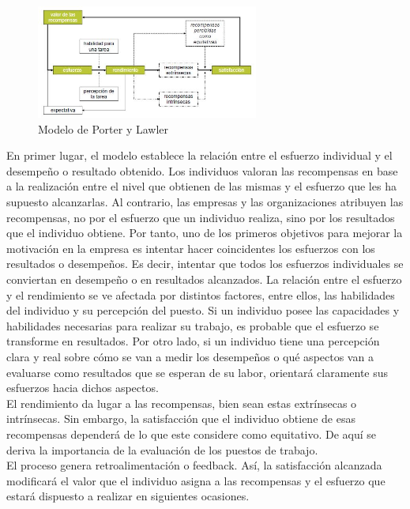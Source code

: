 \documentclass[12pt]{article}
\theoremstyle{definition_wo_parentheses}
\begin{document}
\begin{figure}[H]
\centering
\includegraphics[width=0.65\textwidth]{porter}
\caption{Modelo de Porter y Lawler}
\label{fig:porter}
\end{figure}

En primer lugar, el modelo establece la relación entre el esfuerzo individual y el desempeño o resultado obtenido. Los individuos valoran las recompensas en base a la realización entre el nivel que obtienen de las mismas y el esfuerzo que les ha supuesto alcanzarlas. Al contrario, las empresas y las organizaciones atribuyen las recompensas, no por el esfuerzo que un individuo realiza, sino por los resultados que el individuo obtiene. Por tanto, uno de los primeros objetivos para mejorar la motivación  en la empresa es intentar hacer coincidentes los esfuerzos con los resultados o desempeños. Es decir, intentar que todos los esfuerzos individuales se conviertan en desempeño o en resultados alcanzados. La relación entre el esfuerzo y el rendimiento se ve afectada por distintos factores, entre ellos, las habilidades del individuo y su percepción del puesto. Si un individuo posee las capacidades y habilidades necesarias para realizar su trabajo, es probable que el esfuerzo se transforme en resultados. Por otro lado, si un individuo tiene una percepción clara y real sobre cómo se van a medir los desempeños o qué aspectos van a evaluarse como resultados que se esperan de su labor, orientará claramente sus esfuerzos hacia dichos aspectos.\\

El rendimiento da lugar a las recompensas, bien sean estas extrínsecas o intrínsecas. Sin embargo, la satisfacción que el individuo obtiene de esas recompensas dependerá de lo que este considere como equitativo. De aquí se deriva la importancia de la evaluación de los puestos de trabajo.\\
El proceso genera retroalimentación o feedback. Así, la satisfacción alcanzada modificará el valor que el individuo asigna a las recompensas y el esfuerzo que estará dispuesto a realizar en siguientes ocasiones.
\end{document}
